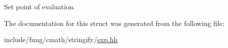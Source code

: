 Set point of evaluation. 



The documentation for this struct was generated from the following file\-:\begin{DoxyCompactItemize}
\item 
include/fung/cmath/stringify/\hyperlink{stringify_2exp_8hh}{exp.\-hh}\end{DoxyCompactItemize}
